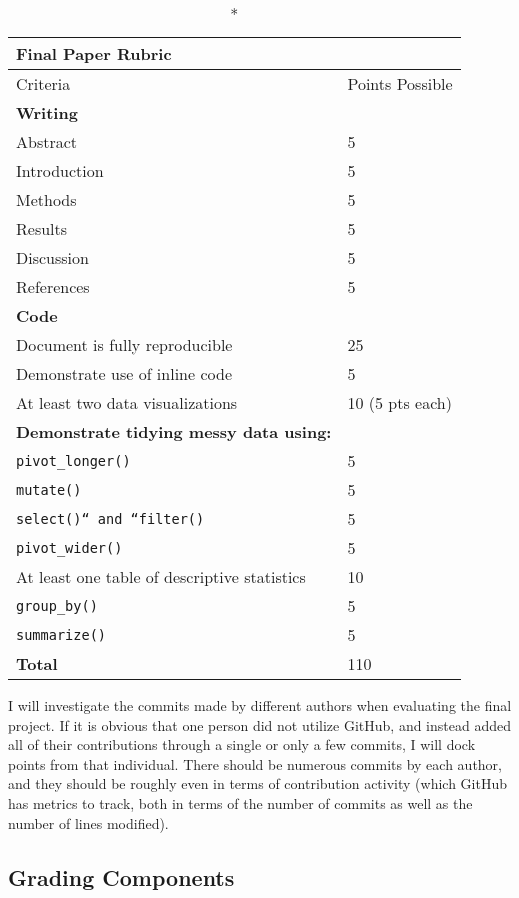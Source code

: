 \documentclass[
  letterpaper,
  DIV=11,
  numbers=noendperiod]{scrartcl}
\begin{document}
\begin{longtable*}{ll}
\caption*{
{\large \textbf{Final Paper Rubric}}
} \\ 
\toprule
Criteria & Points Possible \\ 
\midrule\addlinespace[2.5pt]
\textbf{Writing} &  \\ 
Abstract & 5 \\ 
Introduction & 5 \\ 
Methods & 5 \\ 
Results & 5 \\ 
Discussion & 5 \\ 
References & 5 \\ 
\textbf{Code} &  \\ 
Document is fully reproducible & 25 \\ 
Demonstrate use of inline code & 5 \\ 
At least two data visualizations & 10 (5 pts each) \\ 
\textbf{Demonstrate tidying messy data using:} &  \\ 
\texttt{pivot\_longer()} & 5 \\ 
\texttt{mutate()} & 5 \\ 
\texttt{select()`` and ``filter()} & 5 \\ 
\texttt{pivot\_wider()} & 5 \\ 
At least one table of descriptive statistics & 10 \\ 
\texttt{group\_by()} & 5 \\ 
\texttt{summarize()} & 5 \\ 
\textbf{Total} & 110 \\ 
\bottomrule
\end{longtable*}

I will investigate the commits made by different authors when evaluating
the final project. If it is obvious that one person did not utilize
GitHub, and instead added all of their contributions through a single or
only a few commits, I will dock points from that individual. There
should be numerous commits by each author, and they should be roughly
even in terms of contribution activity (which GitHub has metrics to
track, both in terms of the number of commits as well as the number of
lines modified).

\hypertarget{grading-components}{%
\subsection{Grading Components}\label{grading-components}}
\end{document}

